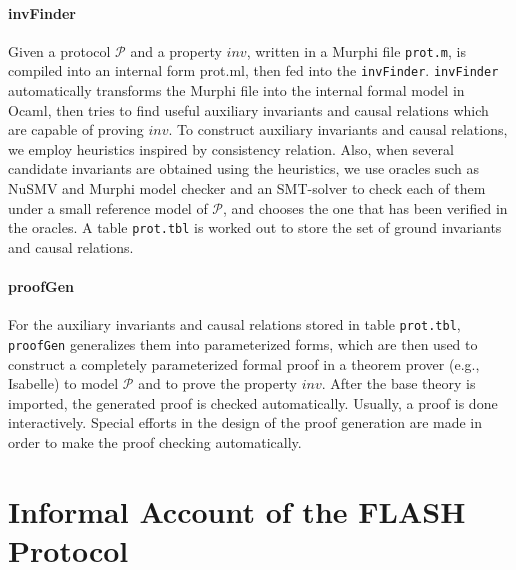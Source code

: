 \documentclass{llncs}
\begin{document}
\paragraph{invFinder}%
Given a protocol $\mathcal{P}$ and a property $inv$,  written in
a Murphi  file {\tt prot.m}, is compiled into an internal form {\sf prot.ml}, then fed into the
\texttt{invFinder}. {\tt invFinder} automatically transforms the Murphi file into the internal formal model in Ocaml, then tries to find useful auxiliary invariants and causal relations which are capable of proving $inv$. To construct auxiliary invariants and causal relations, we employ heuristics inspired by consistency relation. Also, when several candidate invariants are obtained using the heuristics, we use oracles such as NuSMV and Murphi model checker and an SMT-solver to check each of them under a small reference model of $\mathcal{P}$, and chooses the one that has been verified in the oracles. A table {\tt prot.tbl} is worked out  to store the set of ground invariants and
 causal relations.


\paragraph{proofGen} For the auxiliary invariants and causal relations stored in table {\tt prot.tbl}, {\tt proofGen} generalizes them  into  parameterized forms, which are then used to construct a completely parameterized formal proof in a theorem prover (e.g., Isabelle) to model $\mathcal{P}$ and to prove the property $inv$. After the base theory is imported, the generated proof is checked automatically.  Usually, a proof is done interactively. Special efforts in the design of the proof generation are made in order to make the proof checking automatically.




\section{Informal Account of the FLASH Protocol\label{sec:informalOfFLASH}}
\end{document}
